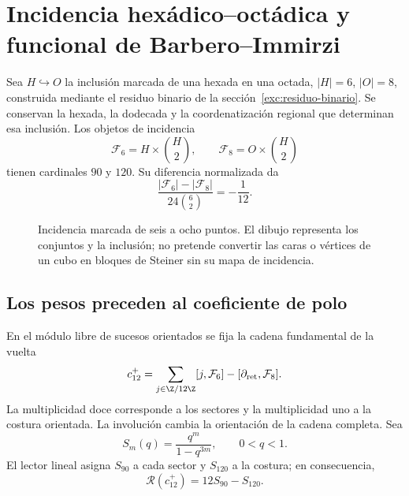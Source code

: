 \section{Incidencia hexádico--octádica y funcional de Barbero--Immirzi}
\label{v:ant:sec:barbero}
Sea $H\hookrightarrow O$ la inclusión marcada de una hexada en una octada,
$|H|=6$, $|O|=8$, construida mediante el residuo binario de la
sección~\ref{exc:residuo-binario}. Se conservan la hexada, la dodecada
y la coordenatización regional que determinan esa inclusión.
Los objetos de incidencia
\[
\mathcal F_6=H\times\binom H2,\qquad
\mathcal F_8=O\times\binom H2
\]
tienen cardinales $90$ y $120$. Su diferencia normalizada da
\[
\frac{|\mathcal F_6|-|\mathcal F_8|}{24\binom62}=-\frac1{12}.
\]
\begin{figure}[htbp]
\centering
{}
\caption{Incidencia marcada de seis a ocho puntos. El dibujo representa
los conjuntos y la inclusión; no pretende convertir las caras o vértices
de un cubo en bloques de Steiner sin su mapa de incidencia.}
\end{figure}

\subsection{Los pesos preceden al coeficiente de polo}
En el módulo libre de sucesos orientados se fija la cadena
fundamental de la vuelta
\[
c_{12}^{+}=
\sum_{j\in\Z/12\Z}[j,\mathcal F_6]
-[\partial_{\rm ret},\mathcal F_8].
\]
La multiplicidad doce corresponde a los sectores y la multiplicidad uno
a la costura orientada. La involución cambia la orientación de la cadena
completa. Sea
\[
S_m(q)=\frac{q^m}{1-q^{3m}},\qquad 0<q<1.
\]
El lector lineal asigna $S_{90}$ a cada sector y $S_{120}$ a la costura;
en consecuencia,
\[
\mathscr R(c_{12}^{+})=12S_{90}-S_{120}.
\]

